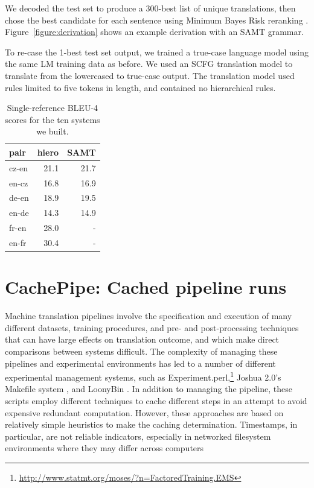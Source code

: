 \documentclass[11pt]{article}
\begin{document}
We decoded the test set to produce a 300-best list of unique
translations, then chose the best candidate for each sentence using
Minimum Bayes Risk reranking \cite{kumar2004minimum}.
Figure~\ref{figure:derivation} shows an example derivation with an
SAMT grammar.

To re-case the 1-best test set output, we trained a true-case language
model using the same LM training data as before.  We used an SCFG
translation model to translate from the lowercased to true-case
output.  The translation model used rules limited to five tokens in length, and contained no hierarchical rules.

\begin{table}[t]
  \centering
  \begin{tabular}{l|rr}
    pair   & hiero & SAMT \\
    \hline\hline
    cz-en  & 21.1  & 21.7 \\
    en-cz  & 16.8  & 16.9 \\
    de-en  & 18.9  & 19.5 \\
    en-de  & 14.3  & 14.9 \\
    fr-en  & 28.0  & - \\
    en-fr  & 30.4  & - \\
  \end{tabular}
  \caption{Single-reference BLEU-4 scores for the ten systems we
    built.  }
  \label{table:results}
\end{table}

\section{CachePipe: Cached pipeline runs}

Machine translation pipelines involve the specification and execution
of many different datasets, training procedures, and pre- and
post-processing techniques that can have large effects on translation
outcome, and which make direct comparisons between systems difficult.
The complexity of managing these pipelines and experimental
environments has led to a number of different experimental management
systems, such as
Experiment.perl,\footnote{\url{http://www.statmt.org/moses/?n=FactoredTraining.EMS}}
Joshua 2.0's Makefile system \cite{li2010joshua}, and LoonyBin
\cite{clark2010loonybin}.  In addition to managing the pipeline, these
scripts employ different techniques to cache different steps in an
attempt to avoid expensive redundant computation.  However, these
approaches are based on relatively simple heuristics to make the
caching determination.  Timestamps, in particular, are not reliable
indicators, especially in networked filesystem environments where
they may differ across computers
\end{document}
